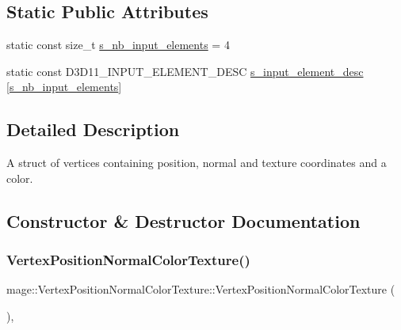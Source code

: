 \subsection*{Static Public Attributes}
\begin{DoxyCompactItemize}
\item 
static const size\+\_\+t \hyperlink{structmage_1_1_vertex_position_normal_color_texture_acd54df21f1baf73279d24dbc7037eeff}{s\+\_\+nb\+\_\+input\+\_\+elements} = 4
\item 
static const D3\+D11\+\_\+\+I\+N\+P\+U\+T\+\_\+\+E\+L\+E\+M\+E\+N\+T\+\_\+\+D\+E\+SC \hyperlink{structmage_1_1_vertex_position_normal_color_texture_a95286a5de390f414f036371f4ad08de1}{s\+\_\+input\+\_\+element\+\_\+desc} \mbox{[}\hyperlink{structmage_1_1_vertex_position_normal_color_texture_acd54df21f1baf73279d24dbc7037eeff}{s\+\_\+nb\+\_\+input\+\_\+elements}\mbox{]}
\end{DoxyCompactItemize}


\subsection{Detailed Description}
A struct of vertices containing position, normal and texture coordinates and a color. 

\subsection{Constructor \& Destructor Documentation}
\hypertarget{structmage_1_1_vertex_position_normal_color_texture_a50e877f0cef0e1422d5053a911c877ec}{}\label{structmage_1_1_vertex_position_normal_color_texture_a50e877f0cef0e1422d5053a911c877ec} 
\subsubsection{\texorpdfstring{Vertex\+Position\+Normal\+Color\+Texture()}{VertexPositionNormalColorTexture()}\hspace{0.1cm}{\footnotesize\ttfamily [1/4]}}
{\footnotesize\ttfamily mage\+::\+Vertex\+Position\+Normal\+Color\+Texture\+::\+Vertex\+Position\+Normal\+Color\+Texture (\begin{DoxyParamCaption}{ }\end{DoxyParamCaption})\hspace{0.3cm}{\ttfamily [default]}, {\ttfamily [noexcept]}}

